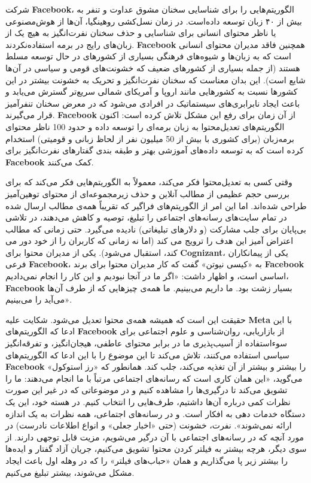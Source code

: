 شرکت \textenglish{\textbf{Facebook}}، الگوریتم‌هایی را برای شناسایی سخنان مشوق عداوت و تنفر به بیش از ۴۰ زبان توسعه داده‌است.
در زمان نسل‌کشی روهینگیا، آن‌ها از هوش‌مصنوعی یا ناظر محتوای انسانی برای شناسایی و حذف سخنان نفرت‌انگیز به هیچ یک از زبان‌های رایج در برمه استفاده‌نکردند.
\textenglish{\textbf{Facebook}} همچنین فاقد مدیران محتوای انسانی است که به زبان‌ها و شیوه‌های فرهنگی بسیاری از کشورهای در حال توسعه مسلط هستند (از جمله بسیاری از کشورهای ضعیف که خشونت‌های قومی و سیاسی در آن‌ها شایع است).
این بدان معناست که سخنان نفرت‌انگیز و تحریک به خشونت بیشتر در این کشورها نسبت به کشورهایی مانند اروپا و آمریکای شمالی سریع‌تر گسترش می‌یابد و باعث ایجاد نابرابری‌های سیستماتیک در افرادی می‌شود که در معرض سخنان تنفرآمیز قرار می‌گیرند.
\textenglish{\textbf{Facebook}} از آن زمان برای رفع این مشکل تلاش کرده است: اکنون الگوریتم‌های تعدیل‌محتوا به زبان برمه‌ای را توسعه داده و حدود 100 ناظر محتوای برمه‌زبان (برای کشوری با بیش از 50 میلیون نفر از لحاظ زبانی و قومیتی) استخدام کرده است که به توسعه داده‌های آموزشی بهتر و طبقه بندی گفتارهای نفرت‌انگیز برای \textenglish{\textbf{Facebook}} کمک می‌کنند.

وقتی کسی به تعدیل‌محتوا فکر می‌کند، معمولاً به الگوریتم‌هایی فکر می‌کند که برای بررسی حجم عظیمی از مطالب آنلاین و حذف زیرمجموعه‌ای از محتوای توهین‌آمیز طراحی شده‌اند.
اما این امر از الگوریتم‌های فراگیر که تقریباً همه‌ی مطالب ارسال شده در تمام سایت‌های رسانه‌های اجتماعی را تبلیغ، توصیه و کاهش می‌دهند، در تلاشی بی‌پایان برای جلب مشارکت (و دلارهای تبلیغاتی) نادیده می‌گیرد.
حتی زمانی که مطالب اعتراض آمیز این هدف را ترویج می کند (اما نه زمانی که کاربران را از خود دور می کند، استقبال می‌شود).
یکی از مدیران محتوا برای \textenglish{\textbf{Cognizant}}، یکی از پیمانکاران فرعی \textenglish{\textbf{Facebook}}، به «کیسی نیوتن» گفت که کار مدیران محتوا برای برند \textenglish{\textbf{Facebook}} اساسی است، و اظهار داشت: «اگر ما در آنجا نبودیم و این کار را انجام نمی‌دادیم، \textenglish{\textbf{Facebook}} بسیار زشت بود.
ما داریم می‌بینیم.
ما همه‌ی چیزهایی که از طرف آن‌ها می‌آید را می‌بینیم».

حقیقت این است که همیشه همه‌ی محتوا تعدیل می‌شود.
شکایت علیه \textenglish{\textbf{Meta}} با این ادعا که الگوریتم‌های \textenglish{\textbf{Facebook}} از بازاریابی، روان‌شناسی و علوم اجتماعی برای سوء‌استفاده از آسیب‌پذیری ما در برابر محتوای عاطفی، هیجان‌انگیز، و تفرقه‌انگیز سیاسی استفاده می‌کنند، تلاش می‌کند تا این موضوع را با این ادعا که الگوریتم‌های \textenglish{\textbf{Facebook}} را بیشتر و بیشتر از آن تغذیه می‌کند، جلب کند.
همانطور که «رز استوکول» می‌گوید، «این همان کاری است که رسانه‌های اجتماعی مرتباً با ما انجام می‌دهند: ما را تشویق می‌کند تا درگیری‌ها را مشاهده کنیم و در موضوعاتی که در غیر این صورت نظرات کمی درباره آن‌ها داشتیم، طرف‌هایی را انتخاب کنیم.
در هسته خود، این یک دستگاه خدمات دهی به افکار است.
و در رسانه‌های اجتماعی، همه نظرات به یک اندازه ارائه نمی‌شوند».
نفرت، خشونت (حتی «اخبار جعلی» و انواع اطلاعات نادرست) در مورد آنچه که در رسانه‌های اجتماعی با آن درگیر می‌شویم، مزیت قابل توجهی دارند.
از سوی دیگر، هرچه بیشتر به فیلتر کردن محتوا تشویق می‌کنیم، جریان آزاد گفتار و ایده‌ها را بیشتر زیر پا می‌گذاریم و همان «حباب‌های فیلتر» را که در وهله اول باعث ایجاد مشکل می‌شوند، بیشتر تبلیغ می‌کنیم.

